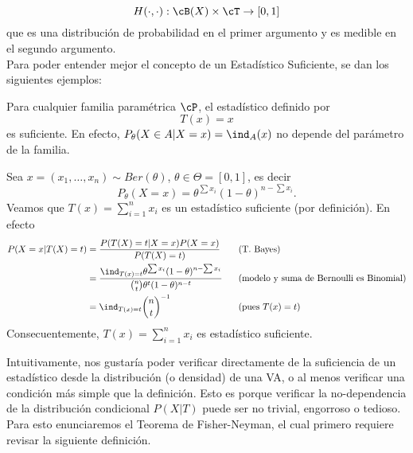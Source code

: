 \begin{equation}
\nonumber
	H(\cdot,\cdot): \cB(X)\times\cT \rightarrow [0,1]
\end{equation}
que es una distribución de probabilidad en el primer argumento y es medible en el segundo argumento.\\

Para poder entender mejor el concepto de un Estadístico Suficiente, se dan los siguientes ejemplos:

\begin{example}
	\label{ex:suficiencia_trivial}
	Para cualquier familia paramétrica $\cP$, el estadístico definido por
	\begin{equation}
	\nonumber
		T(x) = x
	\end{equation}
es suficiente. En efecto, $P_\theta(X\in A|X=x) = \ind_{A}(x)$ no depende del parámetro de la familia. 
\end{example}

\begin{example}
	Sea $x=(x_1,\ldots,x_n) \sim Ber(\theta)$, $\theta \in \Theta = [0,1]$, es decir
	\begin{equation}
	\nonumber
		P_\theta(X=x) = \theta^{\sum x_i}(1-\theta)^{n-\sum x_i}.
	\end{equation}
	Veamos que $T(x) = \sum\limits_{i=1}^{n} x_i$ es un estadístico suficiente (por definición). En efecto
	\begin{alignat*}{3}
		P(X=x|T(X)=t) 	&= \frac{P(T(X)=t| X=x )P( X=x )}{P(T(X)=t)} \quad&&\text{(T. Bayes)}\\
						&= \frac{\ind_{T(x)=t}\theta^{\sum x_i}(1-\theta)^{n-\sum x_i}}{\binom{n}{t}\theta^t(1-\theta)^{n-t}} &&\text{(modelo y suma de Bernoulli es Binomial)}\\
						&= \ind_{T(x)=t} \binom{n}{t}^{-1} && \text{(pues $T(x)=t$)}
	\end{alignat*}
	Consecuentemente, $T(x)=\sum\limits_{i=1}^{n} x_i$ es estadístico suficiente.
\end{example}

Intuitivamente, nos gustaría poder verificar directamente de la suficiencia de un estadístico desde la distribución (o densidad) de una VA, o al menos verificar una condición más simple que la definición. Esto es porque verificar la no-dependencia de la distribución condicional $P(X|T)$ puede ser no trivial, engorroso o tedioso. Para esto enunciaremos el Teorema de Fisher-Neyman, el cual primero requiere revisar la siguiente definición. 

